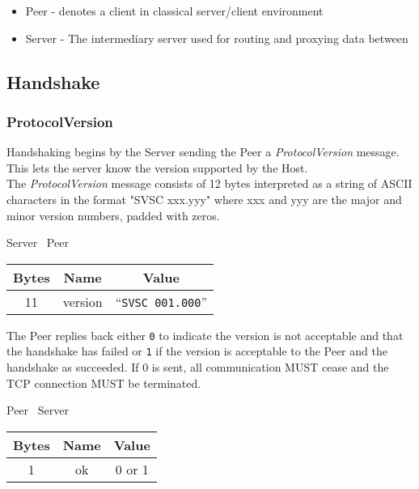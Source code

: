 \documentclass{article}
\begin{document}
    \begin{itemize}
        \item Peer - denotes a client in classical server/client environment
        \item Server - The intermediary server used for routing and proxying data between
    \end{itemize}

    \subsection{Handshake}

    \subsubsection{ProtocolVersion}

    Handshaking begins by the Server sending the Peer a \emph{ProtocolVersion} message. This lets the server know
    the version supported by the Host.\\

    The \emph{ProtocolVersion} message consists of 12 bytes interpreted as a string of ASCII characters in the format
    "SVSC xxx.yyy" where xxx and yyy are the major and minor version numbers, padded with zeros.

    \begin{center}
        Server \textrightarrow\ Peer\\
        \begin{tabular}{|c|c|c|}
            \hline
            \textbf{Bytes} & \textbf{Name} & \textbf{Value}            \\
            \hline
            11             & version       & ``\texttt{SVSC 001.000}'' \\
            \hline
        \end{tabular}
    \end{center}

    The Peer replies back either \texttt{0} to indicate the version is not acceptable and that the handshake has
    failed or \texttt{1} if the version is acceptable to the Peer and the handshake as succeeded. If 0 is sent, all
    communication MUST cease and the TCP connection MUST be terminated.

    \begin{center}
        Peer \textrightarrow\ Server\\
        \begin{tabular}{|c|c|c|}
            \hline
            \textbf{Bytes} & \textbf{Name} & \textbf{Value} \\
            \hline
            1              & ok            & 0 or 1         \\
            \hline
        \end{tabular}
    \end{center}
\end{document}
